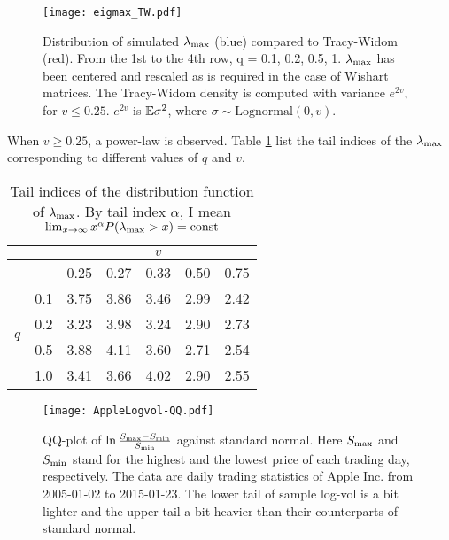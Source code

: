 \documentclass{article}
\begin{document}
\begin{figure}[htb!]
  \centering
  \texttt{[image: eigmax\_TW.pdf]}
  \caption{Distribution of simulated $\lambda_{\text{max}}$ (blue) compared to
    Tracy-Widom (red). From the 1st to the 4th row, q = 0.1, 0.2, 0.5,
    1. $\lambda_{\text{max}}$ has been centered and rescaled as is required in
    the case of Wishart matrices. The Tracy-Widom density is computed
    with variance $e^{2v}$, for $v \le 0.25$. $e^{2v}$ is $\mathbb{E} \sigma^2$,
    where $\sigma \sim \text{Lognormal}(0, v)$.}
  \label{fig:eigmax_TW}
\end{figure}

When $v \ge 0.25$, a power-law is observed. Table
\ref{tab:tail_indices} list the tail indices of the $\lambda_{\text{max}}$
corresponding to different values of $q$ and $v$.
\begin{table}[htb!]
  \centering
  \begin{tabular}{|c|c|c|c|c|c|c|}
    \hline
    \multicolumn{2}{|c|}{} & \multicolumn{5}{|c|}{$v$} \\
    \hline
    \multicolumn{2}{|c|}{} & 0.25 & 0.27 & 0.33 & 0.50 & 0.75 \\
    \hline
    \multirow{4}{*}{$q$} & 0.1 & 3.75 & 3.86 & 3.46 & 2.99 & 2.42 \\
    & 0.2 & 3.23 & 3.98 & 3.24 & 2.90 & 2.73 \\
    & 0.5 & 3.88 & 4.11 & 3.60 & 2.71 & 2.54 \\
    & 1.0 & 3.41 & 3.66 & 4.02 & 2.90 & 2.55 \\
    \hline
  \end{tabular}
  \caption{Tail indices of the distribution function of
    $\lambda_{\text{max}}$. By tail index $\alpha$, I mean $\lim_{x \to \infty}
    x^\alpha P(\lambda_{\text{max}} > x) = \text{const}$}
  \label{tab:tail_indices}
\end{table}

\begin{figure}[htb!]
  \centering
  \texttt{[image: AppleLogvol-QQ.pdf]}
  \caption{QQ-plot of $\ln{ S_ {\text{max}} - S_ {\text{min}} \over S_ {\text{min}} }$ against standard
    normal. Here $S_{\text{max}}$ and $S_{\text{min}}$ stand for the highest and the
    lowest price of each trading day, respectively. The data are daily
    trading statistics of Apple Inc. from 2005-01-02 to 2015-01-23. The
    lower tail of sample log-vol is a bit lighter and the upper tail a
    bit heavier than their counterparts of standard normal.}
  \label{fig:qqplot_logvol}
\end{figure}
\end{document}
